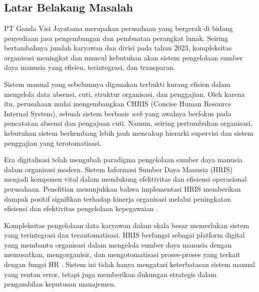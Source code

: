 \chapter{\babSatu}

\section{Latar Belakang Masalah}
PT Ganda Visi Jayatama merupakan perusahaan yang bergerak di bidang penyediaan 
jasa pengembangan dan pembuatan perangkat lunak. Seiring bertambahnya jumlah 
karyawan dan divisi pada tahun 2023, kompleksitas organisasi meningkat dan 
muncul kebutuhan akan sistem pengelolaan sumber daya manusia yang efisien, 
terintegrasi, dan transparan.

Sistem manual yang sebelumnya digunakan terbukti kurang efisien dalam 
mengelola data absensi, cuti, struktur organisasi, dan penggajian. Oleh karena itu, 
perusahaan mulai mengembangkan CHRIS (Concise Human Resource Internal System), 
sebuah sistem berbasis \textit{web} yang awalnya berfokus pada pencatatan absensi dan 
pengajuan cuti. Namun, seiring pertumbuhan organisasi, kebutuhan sistem berkembang 
lebih jauh mencakup hierarki supervisi dan sistem penggajian yang terotomatisasi.

Era digitalisasi telah mengubah paradigma pengelolaan sumber daya manusia dalam organisasi modern. Sistem Informasi Sumber Daya Manusia (HRIS) menjadi komponen vital dalam mendukung efektivitas dan efisiensi operasional perusahaan. Penelitian menunjukkan bahwa implementasi HRIS memberikan dampak positif signifikan terhadap kinerja organisasi melalui peningkatan efisiensi dan efektivitas pengelolaan kepegawaian \cite{khashman2016impact}.

Kompleksitas pengelolaan data karyawan dalam skala besar memerlukan sistem yang terintegrasi dan terautomatisasi. HRIS berfungsi sebagai platform digital yang membantu organisasi dalam mengelola sumber daya manusia dengan memusatkan, mengorganisir, dan mengotomatisasi proses-proses yang terkait dengan fungsi HR \cite{abdullah2023impact}. Sistem ini tidak hanya mengatasi keterbatasan sistem manual yang rentan error, tetapi juga memberikan dukungan strategis dalam pengambilan keputusan manajemen.

